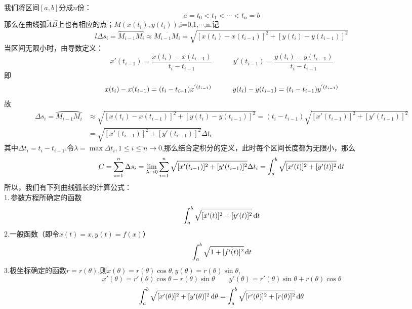 \par 我们将区间$[a,b]$分成$n$份：
\begin{equation}
	\nonumber
	a=t_0<t_1<\cdots<t_n=b
\end{equation}
那么在曲线弧$\wideparen{AB}$上也有相应的点；$M(x(t_i),y(t_i))$,i=0,1,$\cdots$,n.记
\begin{equation}l
	\Delta s_i=\wideparen{M_{i-1}M_i}\approx\overline{M_{i-1}M_i} =\sqrt{[x(t_i)-x(t_{i-1})]^2+[y(t_i)-y(t_{i-1})]^2}
\end{equation}
当区间无限小时，由导数定义：
\begin{equation}
	x'(t_{i-1})=\frac{x(t_i)-x(t_{i-1})}{t_i-t_{i-1}}\hspace{3em} y'(t_{i-1})=\frac{y(t_i)-y(t_{i-1})}{t_i-t_{i-1}}
\end{equation}
即
\begin{equation}
	x(t_i)-x(t_{i-1})=(t_i-t_{i-1})x^{'(t_{i-1})} \hspace*{3em}	y(t_i)-y(t_{i-1})=(t_i-t_{i-1})y^{'(t_{i-1})}
\end{equation}
故
\begin{align*}
	\Delta s_i=\wideparen{M_{i-1}M_i} &\approx \sqrt{[x(t_i)-x(t_{i-1})]^2+[y(t_i)-y(t_{i-1})]^2}=(t_i-t_{i-1})\sqrt{[x'(t_{i-1})]^2+[y'(t_{i-1})]^2}\\[0.5em]
	& =\sqrt{[x'(t_{i-1})]^2+[y'(t_{i-1})]^2}\Delta t_i
\end{align*}
其中$\Delta t_i=t_i-t_{i-1}$.令$\lambda=\max{\Delta t_i,1\leq i\leq n}\to0$,那么结合定积分的定义，此时每个区间长度都为无限小，那么
\begin{equation}
	C=\sum_{i=1}^{n}\Delta s_i=\lim\limits_{\lambda\to 0}\sum_{i=1}^{n}\sqrt{[x'(t_{i-1})]^2+[y'(t_{i-1})]^2}\Delta t_i=\int_{a}^{b}\sqrt{[x'(t)]^2+[y'(t)]^2}\,{\rm{d}} t
\end{equation}
所以，我们有下列曲线弧长的计算公式：
\\ 1.$\,$参数方程所确定的函数
\begin{equation}
	\int_{a}^{b}\sqrt{[x'(t)]^2+[y'(t)]^2}\,{\rm{d}} t
\end{equation}
2.一般函数（即令$x(t)=x,y(t)=f(x)$）
\begin{equation}
	\int_{a}^{b}\sqrt{1+[f'(t)]^2}\,{\rm{d}} t
\end{equation}
3.极坐标确定的函数$r=r(\theta)$,则$x(\theta)=r(\theta)\cos \theta,y(\theta)=r(\theta)\sin\theta$,
\begin{equation}
	\nonumber
	x'(\theta)=r'(\theta)\cos \theta-r(\theta)\sin \theta \hspace{2em} y'(\theta)=r'(\theta)\sin \theta+r(\theta)\cos \theta
\end{equation}
\begin{equation}
	\int_{a}^{b}\sqrt{[x'(\theta)]^2+[y'(\theta)]^2}\,{\rm{d}} \theta=\int_{a}^{b}\sqrt{[r'(\theta)]^2+[r(\theta)]^2}\,{\rm{d}} \theta
\end{equation}

